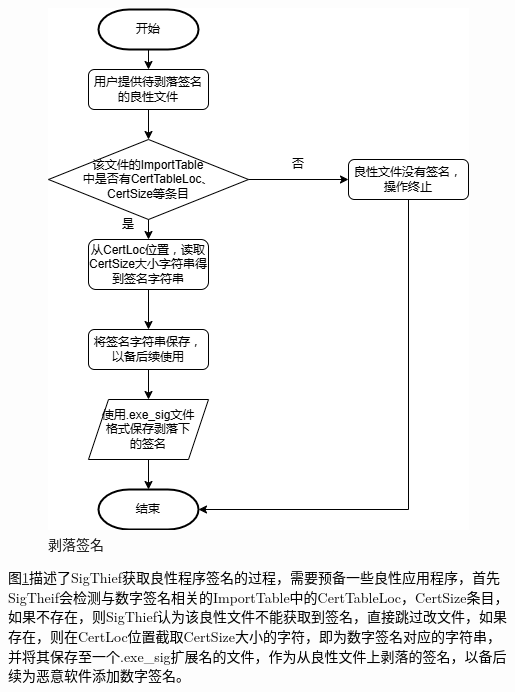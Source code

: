 \begin{figure}[htbp]
  \centering
  \includegraphics[]{images/peel_signature.png}
  \caption{剥落签名}\label{fig:peel_signature}
\end{figure}
\textcolor{black}{图\ref{fig:peel_signature}描述了SigThief获取良性程序签名的过程，需要预备一些良性应用程序，首先SigTheif会检测与数字签名相关的ImportTable中的CertTableLoc，CertSize条目，如果不存在，则SigThief认为该良性文件不能获取到签名，直接跳过改文件，如果存在，则在CertLoc位置截取CertSize大小的字符，即为数字签名对应的字符串，并将其保存至一个.exe\_sig扩展名的文件，作为从良性文件上剥落的签名，以备后续为恶意软件添加数字签名。}

